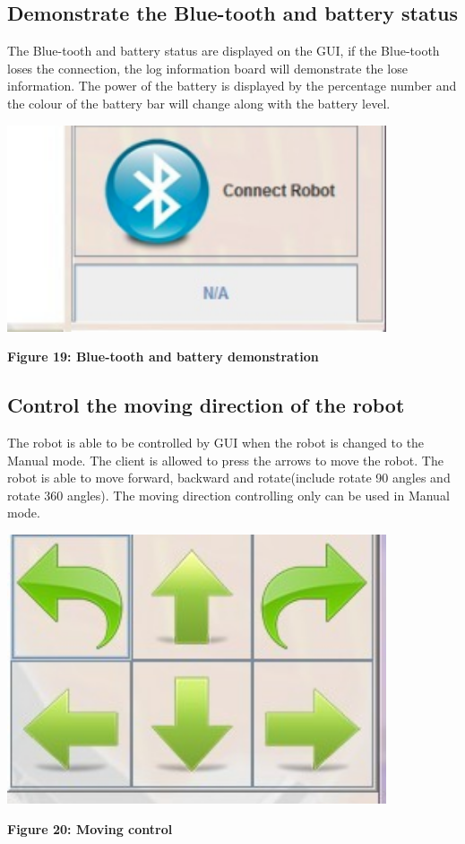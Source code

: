 \documentclass[11pt, a4paper]{report}
\begin{document}
\subsection{Demonstrate the Blue-tooth and battery status}
The Blue-tooth and battery status are displayed on the GUI, if the Blue-tooth loses the connection, the log information board will demonstrate the lose information. The power of the battery is displayed by the percentage number and the colour of the battery bar will change along with the battery level.
 \begin{center}
 \includegraphics[width=11.20cm]{bluetooth_battery}
\end{center}
\begin{center}
\textbf {Figure 19: Blue-tooth and battery demonstration } \\[0.3cm]
\end{center}
\subsection{Control the moving direction of the robot}
The robot is able to be controlled by GUI when the robot is changed to the Manual mode. The client is allowed to press the arrows to move the robot. The robot is able to move forward, backward and rotate(include rotate 90 angles and rotate 360 angles). The moving direction controlling only can be used in Manual mode.
 \begin{center}
 \includegraphics[width=11.20cm]{ControlButton.jpg}
\end{center}
\begin{center}
\textbf {Figure 20: Moving control} \\[0.3cm]
\end{center}
\end{document}

